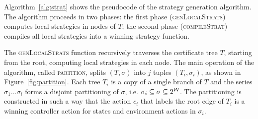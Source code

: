 Algorithm~\ref{alg:strat} shows the pseudocode of the strategy generation algorithm.  The algorithm proceeds in two phases: the first phase (\textsc{genLocalStrats}) computes local strategies in nodes of $T$; the second phase (\textsc{compileStrat}) compiles all local strategies into a winning strategy function.

The \textsc{genLocalStrats} function recursively traverses the certificate tree $T$, starting from the root, computing local strategies in each node.  The main operation of the algorithm, called \textsc{partition}, splits $(T, \sigma)$ into $j$ tuples $(T_i, \sigma_i)$, as shown in Figure~\ref{fig:partition}.  Each tree $T_i$ is a copy of a single branch of $T$ and the series $\sigma_1 \ldots \sigma_i$ forms a disjoint partitioning of $\sigma$, i.e. $\sigma_i \subseteq \sigma \subseteq 2^{\mathcal{W}}$.  The partitioning is constructed in such a way that the action $c_i$ that labels the root edge of $T_i$ is a winning controller action for states and environment actions in $\sigma_i$.

